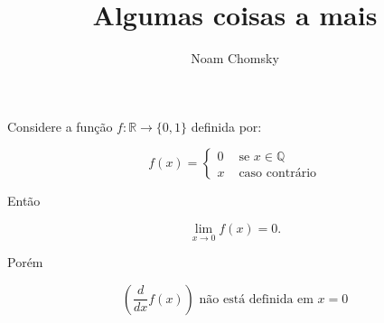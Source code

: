 \documentclass[12pt, a4paper]{article}
\title{Algumas coisas a mais}
\author{Noam Chomsky}
\date{}
\begin{document}
  \maketitle

  Considere a função $f:\mathbb{R} \to \{0,1\}$ definida por:

  \[
    f(x) =
    \begin{cases}
      0 & \text{ se } x \in \mathbb{Q} \\
      x & \text{ caso contrário}
    \end{cases}
  \]

  Então

  \[
    \lim_{x \to 0} f(x) = 0.
  \]

  Porém

  \[
    \left( \frac{d}{dx} f(x) \right) \text{ não está definida em } x=0
  \]
\end{document}
